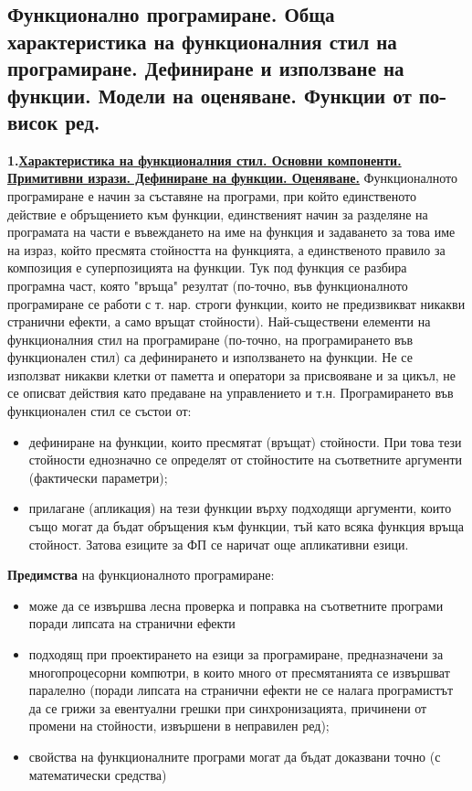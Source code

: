\documentclass{article}
\begin{document}
\subsection*{Функционално програмиране. Обща характеристика на функционалния стил на програмиране.
Дефиниране и използване на функции. Модели на оценяване. Функции от по-висок ред.}

\textbf{1.\underline{Характеристика на функционалния стил. Основни компоненти.} \\ \underline{Примитивни изрази.
Дефиниране на функции. Оценяване.}} \newline\newline
Функционалното програмиране е начин за съставяне на програми, при който единственото действие е обръщението към функции,
единственият начин за разделяне на програмата на части е въвеждането на име на функция и задаването за това име на израз, който
пресмята стойността на функцията, а единственото правило за композиция е суперпозицията на функции. Тук под функция се разбира
програмна част, която "връща" резултат (по-точно, във функционалното програмиране се работи с т. нар. строги функции, които не
предизвикват никакви странични ефекти, а само връщат стойности). Най-съществени елементи на функционалния стил на програмиране
(по-точно, на програмирането във функционален стил) са дефинирането и използването на функции. Не се използват никакви клетки от
паметта и оператори за присвояване и за цикъл, не се описват действия като предаване на управлението и т.н.
Програмирането във функционален стил се състои от:
\begin{itemize}
    \item дефиниране на функции, които пресмятат (връщат) стойности. При това тези стойности еднозначно се определят от
    стойностите на съответните аргументи (фактически параметри);
    \item прилагане (апликация) на тези функции върху подходящи аргументи, които също могат да бъдат обръщения към функции,
    тъй като всяка функция връща стойност. Затова езиците за ФП се наричат още апликативни езици.
\end{itemize}
\textbf{Предимства} на функционалното програмиране:
\begin{itemize}
    \item може да се извършва лесна проверка и поправка на съответните програми поради липсата на странични ефекти
    \item подходящ при проектирането на езици за програмиране, предназначени за многопроцесорни компютри, в които
    много от пресмятанията се извършват паралелно (поради липсата на странични ефекти не се налага програмистът
    да се грижи за евентуални грешки при синхронизацията, причинени от промени на стойности, извършени в
    неправилен ред);
    \item свойства на функционалните програми могат да бъдат доказвани точно (с математически средства)
\end{itemize}
\end{document}
